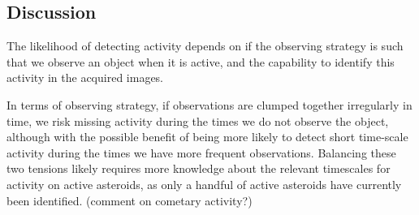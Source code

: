 
\subsection{Discussion}
\label{sec:\secname:discussion}

The likelihood of detecting activity depends on if the observing
strategy is such that we observe an object when it is active, and the
capability to identify this activity in the acquired images.

In terms of observing strategy, if observations are clumped together
irregularly in time, we risk missing activity during the times we do
not observe the object, although with the possible benefit of being
more likely to detect short time-scale activity during the times we
have more frequent observations. Balancing these two tensions likely
requires more knowledge about the relevant timescales for activity on
active asteroids, as only a handful of active asteroids have currently
been identified. (comment on cometary activity?)

